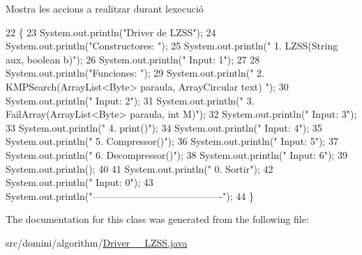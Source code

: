 Mostra les accions a realitzar durant l\textquotesingle{}execució 


\begin{DoxyCode}
22                                      \{
23         System.out.println(\textcolor{stringliteral}{"Driver de LZSS"});
24         System.out.println(\textcolor{stringliteral}{"Constructores: "});
25         System.out.println(\textcolor{stringliteral}{"     1. LZSS(String aux, boolean b)"});
26         System.out.println(\textcolor{stringliteral}{"     Input: 1"});
27 
28         System.out.println(\textcolor{stringliteral}{"Funciones: "});
29         System.out.println(\textcolor{stringliteral}{"     2. KMPSearch(ArrayList<Byte> paraula, ArrayCircular text) "});
30         System.out.println(\textcolor{stringliteral}{"     Input: 2"});
31         System.out.println(\textcolor{stringliteral}{"     3. FailArray(ArrayList<Byte> paraula, int M)"});
32         System.out.println(\textcolor{stringliteral}{"     Input: 3"});
33         System.out.println(\textcolor{stringliteral}{"     4. print()"});
34         System.out.println(\textcolor{stringliteral}{"     Input: 4"});
35         System.out.println(\textcolor{stringliteral}{"     5. Compressor()"});
36         System.out.println(\textcolor{stringliteral}{"     Input: 5"});
37         System.out.println(\textcolor{stringliteral}{"     6. Decompressor()"});
38         System.out.println(\textcolor{stringliteral}{"     Input: 6"});
39         System.out.println();
40 
41         System.out.println(\textcolor{stringliteral}{"     0. Sortir"});
42         System.out.println(\textcolor{stringliteral}{"     Input: 0"});
43         System.out.println(\textcolor{stringliteral}{"----------------------------------------"});
44     \}
\end{DoxyCode}


The documentation for this class was generated from the following file\+:\begin{DoxyCompactItemize}
\item 
src/domini/algorithm/\hyperlink{Driver____LZSS_8java}{Driver\+\_\+\+\_\+\+L\+Z\+S\+S.\+java}\end{DoxyCompactItemize}
